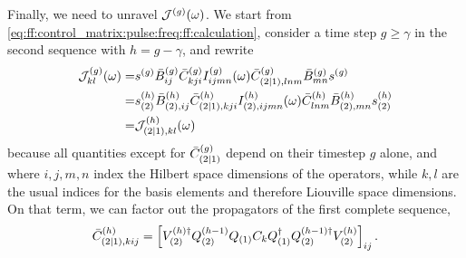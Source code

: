 Finally, we need to unravel $\mathcal{J}^{(g)}(\omega)$.
We start from \cref{eq:ff:control_matrix:pulse:freq:ff:calculation}, consider a time step $g\geq\gamma$ in the second sequence with $h = g-\gamma$, and rewrite
\begin{align}
        \mathcal{J}_{kl}^{(g)}(\omega) =& s^{(g)} \bar{B}_{ij}^{(g)} \bar{C}_{kji}^{(g)} I_{ijmn}^{(g)}(\omega)
                                       \bar{C}_{(2|1),lnm}^{(g)} \bar{B}_{mn}^{(g)} s^{(g)} \notag \\
                                   =& s_{(2)}^{(h)} \bar{B}_{(2),ij}^{(h)} \bar{C}_{(2|1),kji}^{(h)} I_{(2),ijmn}^{(h)}(\omega)
                                       \bar{C}_{lnm}^{(h)} \bar{B}_{(2),mn}^{(h)} s_{(2)}^{(h)} \notag \\
                                   =& \mathcal{J}_{(2|1),kl}^{(h)}(\omega) \label{eq:app:ff:filter_function:incomplete_timestep}
\end{align}
because all quantities except for $\bar{C}_{(2|1)}^{(g)}$ depend on their timestep $g$ alone, and where $i,j,m,n$ index the Hilbert space dimensions of the operators, while $k,l$ are the usual indices for the basis elements and therefore Liouville space dimensions.
On that term, we can factor out the propagators of the first complete sequence,
\begin{align}
    \bar{C}_{(2|1),kij}^{(h)} = \left[V_{(2)}^{(h)\dagger}Q_{(2)}^{(h-1)} Q_{(1)} C_k Q_{(1)}^\dagger Q_{(2)}^{(h-1)\dagger}V_{(2)}^{(h)}\right]_{ij}.
\end{align}

